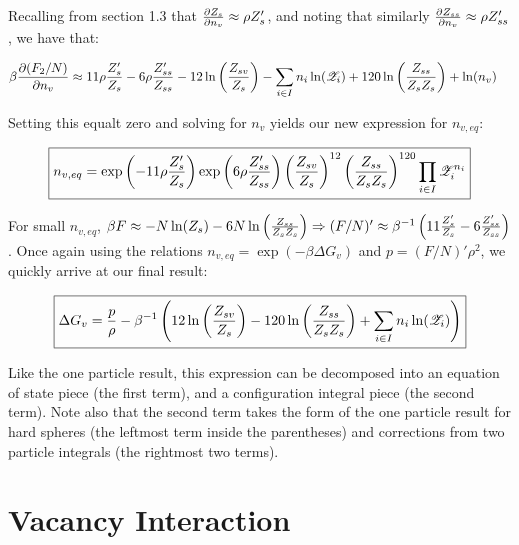 \documentclass[paper=a4, fontsize=11pt]{scrartcl} %
\numberwithin{equation}{section} %
\numberwithin{figure}{section} %
\numberwithin{table}{section} %
\begin{document}
Recalling from section 1.3 that $\frac{\partial Z_s}{\partial n_v} \approx \rho Z_s'$, and noting
that similarly $\frac{\partial Z_{ss}}{\partial n_v} \approx \rho Z_{ss}'$, we have that:

\begin{align}
  \beta\frac{\partial (F_2/N)}{\partial n_v} &\approx 11\rho\frac{Z_s'}{Z_s}-6\rho\frac{Z_{ss}'}{Z_{ss}}-
  12\ln\left(\frac{Z_{sv}}{Z_s}\right)-\sum\limits_{i \in I} n_i \ln(\mathscr{Z}_i)+120\ln\left(\frac{Z_{ss}}{Z_sZ_s}\right)+\ln(n_v)
\end{align}

Setting this equalt zero and solving for $n_v$ yields our new expression for
$n_{v,eq}$:

\begin{align}
  \boxed{
  \label{eq:2phsnveq}
  n_{v,eq} = \exp\left(-11\rho\frac{Z_s'}{Z_s}\right)
             \exp\left(6\rho\frac{Z_{ss}'}{Z_{ss}}\right)
             \left(\frac{Z_{sv}}{Z_s}\right)^{12}
             \left(\frac{Z_{ss}}{Z_sZ_s}\right)^{120}
             \prod\limits_{i\in I}\mathscr{Z}_i^{n_i}
  }
\end{align}

For small $n_{v,eq}$, $\beta F \approx -N\ln(Z_s)-6N\ln\left(\frac{Z_{ss}}{Z_sZ_s}\right) \Rightarrow
(F/N)' \approx \beta^{-1}\left(11\frac{Z_s'}{Z_s}-6\frac{Z_{ss}'}{Z_{ss}}\right)$.
Once again using the relations $n_{v,eq} = \exp(-\beta\Delta G_v)$ and
$p = (F/N)'\rho^2$, we quickly arrive at our final result:

\begin{align}
  \label{eq:2phsdg}
  \boxed{
  \Delta G_v = \frac{p}{\rho} - \beta^{-1}\left(
               12\ln\left(\frac{Z_{sv}}{Z_s}\right)-
           120\ln\left(\frac{Z_{ss}}{Z_sZ_s}\right)+\sum\limits_{i \in I} n_i \ln(\mathscr{Z}_i)\right)}
\end{align}

Like the one particle result, this expression can be decomposed into an equation
of state piece (the first term), and a configuration integral piece (the second term).
Note also that the second term takes the form of the one particle result for hard spheres
(the leftmost term inside the parentheses) and corrections from two particle integrals
(the rightmost two terms).

\section{Vacancy Interaction}
\end{document}
